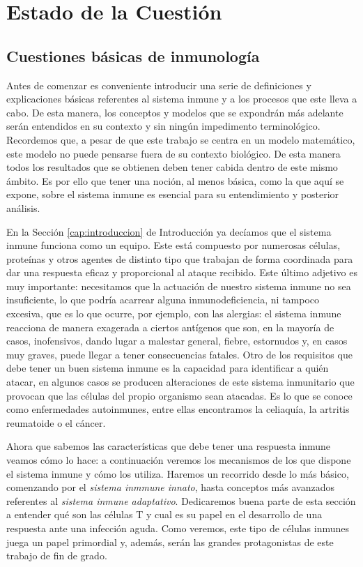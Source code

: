 \chapter{Estado de la Cuestión}
\label{cap:estadoDeLaCuestion}




\section{Cuestiones básicas de inmunología}
\label{sec:cuestInmuno}

Antes de comenzar es conveniente introducir una serie de definiciones y explicaciones básicas referentes al sistema inmune y a los procesos que este lleva a cabo. De esta manera, los conceptos y modelos que se expondrán más adelante serán entendidos en su contexto y sin ningún impedimento terminológico. Recordemos que, a pesar de que este trabajo se centra en un modelo matemático, este  modelo no puede pensarse fuera de su contexto biológico. De esta manera todos los resultados que se obtienen deben tener cabida dentro de este mismo ámbito. Es por ello que tener una noción, al menos básica, como la que aquí se expone, sobre el sistema inmune es esencial para su entendimiento y posterior análisis.

En la Sección \ref{cap:introduccion} de Introducción ya decíamos que el sistema inmune funciona como un equipo. Este está compuesto por numerosas células, proteínas y otros agentes de distinto tipo que trabajan de forma coordinada para dar una respuesta eficaz y proporcional al ataque recibido. Este último adjetivo es muy importante: necesitamos que la actuación de nuestro sistema inmune no sea insuficiente, lo que podría acarrear alguna inmunodeficiencia, ni tampoco excesiva, que es lo que ocurre, por ejemplo, con las alergias: el sistema inmune reacciona de manera exagerada a ciertos antígenos que son, en la mayoría de casos, inofensivos, dando lugar a malestar general, fiebre, estornudos y, en casos muy graves, puede llegar a tener consecuencias fatales. Otro de los requisitos que debe tener un buen sistema inmune es la capacidad para identificar a quién atacar, en algunos casos se producen alteraciones de este sistema inmunitario que provocan que las células del propio organismo sean atacadas. Es lo que se conoce como enfermedades autoinmunes, entre ellas encontramos la celiaquía, la artritis reumatoide o el cáncer.

Ahora que sabemos las características que debe tener una respuesta inmune veamos cómo lo hace: a continuación veremos los mecanismos de los que dispone el sistema inmune y cómo los utiliza. Haremos un recorrido desde lo más básico, comenzando por el \textit{sistema inmmune innato}, hasta conceptos más avanzados referentes al \textit{sistema inmune adaptativo}. Dedicaremos buena parte de esta sección a entender qué son las células T y cual es su papel en el desarrollo de una respuesta ante una infección aguda. Como veremos, este tipo de células inmunes juega un papel primordial y, además, serán las grandes protagonistas de este trabajo de fin de grado.  

